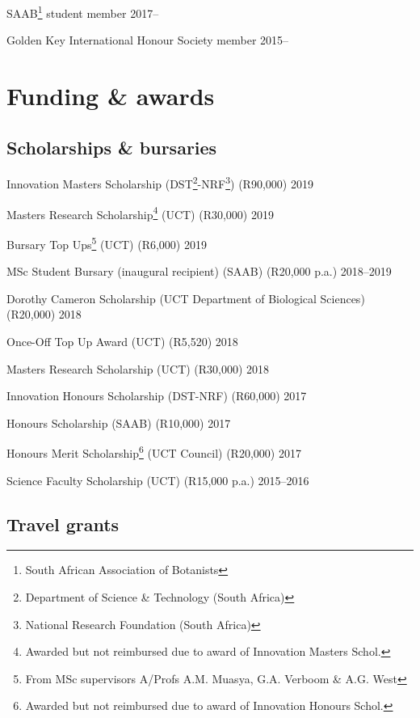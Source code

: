 \documentclass[10pt]{article}
\begin{document}
SAAB\footnote{South African Association of Botanists}
  student member                                                   \hfill 2017--

Golden Key International Honour Society member                     \hfill 2015--

\section*{Funding \& awards} %

\subsection*{Scholarships \& bursaries}

Innovation Masters Scholarship (DST\footnote{Department of Science \&
Technology (South Africa)}-NRF\footnote{National Research Foundation (South 
Africa)}) (R90,000)                                         \hfill 2019

Masters Research Scholarship\footnote{Awarded but not reimbursed due to award 
of Innovation Masters Schol.} (UCT) (R30,000)               \hfill 2019

Bursary Top Ups\footnote{From MSc supervisors A/Profs A.M. Muasya, G.A. Verboom 
\& A.G. West} (UCT) (R6,000)                                \hfill 2019

MSc Student Bursary (inaugural recipient) (SAAB) (R20,000 p.a.)
                                                      \hfill 2018--2019

Dorothy Cameron Scholarship (UCT Department of Biological Sciences) (R20,000)
                                                            \hfill 2018

Once-Off Top Up Award (UCT) (R5,520)                        \hfill 2018

Masters Research Scholarship (UCT) (R30,000)                \hfill 2018

Innovation Honours Scholarship (DST-NRF) (R60,000)          \hfill 2017

Honours Scholarship (SAAB) (R10,000)                        \hfill 2017

Honours Merit Scholarship\footnote{Awarded but not reimbursed due to award of 
Innovation Honours Schol.} (UCT Council) (R20,000)          \hfill 2017

Science Faculty Scholarship (UCT) (R15,000 p.a.)      \hfill 2015--2016

\subsection*{Travel grants}
\end{document}
